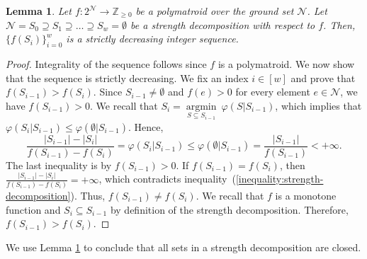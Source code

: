 \documentclass[11pt]{article}
\newtheorem{lemma}{Lemma}
\theoremstyle{definition}
\newcommand{\calN}{{\mathcal{N}}}
\begin{document}
\begin{lemma}\label{lemma:decomposition-value}
    Let $f:2^\mathcal{N}\rightarrow \mathbb{Z}_{\geq 0}$ be a polymatroid over the ground set $\mathcal{N}$. Let $\calN=S_0\supseteq S_1\supseteq \ldots \supseteq S_w=\emptyset$ be a strength decomposition with respect to $f$. Then, $\{f(S_i)\}_{i=0}^{w}$ is a strictly decreasing integer sequence.
\end{lemma}
\begin{proof}
    Integrality of the sequence follows since $f$ is a polymatroid. We now show that the sequence is strictly decreasing. We fix an index $i\in [w]$ and prove that $f(S_{i-1})>f(S_i)$. Since $S_{i-1}\neq \emptyset$ and $f(e)>0$ for every element $e\in \mathcal{N}$, we have $f(S_{i-1})>0$. We recall that $S_i=\mathop{argmin}\limits_{S\subseteq S_{i-1}} \ \varphi(S|S_{i-1})$, which implies that $\varphi(S_i|S_{i-1})\leq \varphi(\emptyset|S_{i-1})$. Hence,
    \begin{equation}\label{inequality:strength-decomposition}
        \frac{|S_{i-1}|-|S_i|}{f(S_{i-1})-f(S_i)}=\varphi(S_i|S_{i-1})\leq \varphi(\emptyset|S_{i-1})=\frac{|S_{i-1}|}{f(S_{i-1})}<+\infty.
    \end{equation}
    The last inequality is by $f(S_{i-1})>0$. If $f(S_{i-1})=f(S_i)$, then $\frac{|S_{i-1}|-|S_i|}{f(S_{i-1})-f(S_i)}=+\infty$, which contradicts inequality~(\ref{inequality:strength-decomposition}). Thus, $f(S_{i-1})\neq f(S_i)$. We recall that $f$ is a monotone function and $S_i\subseteq S_{i-1}$ by definition of the strength decomposition. Therefore, $f(S_{i-1})>f(S_i)$.
\end{proof}

We use Lemma \ref{lemma:decomposition-value} to conclude that all sets in a strength decomposition are closed. 
\end{document}
